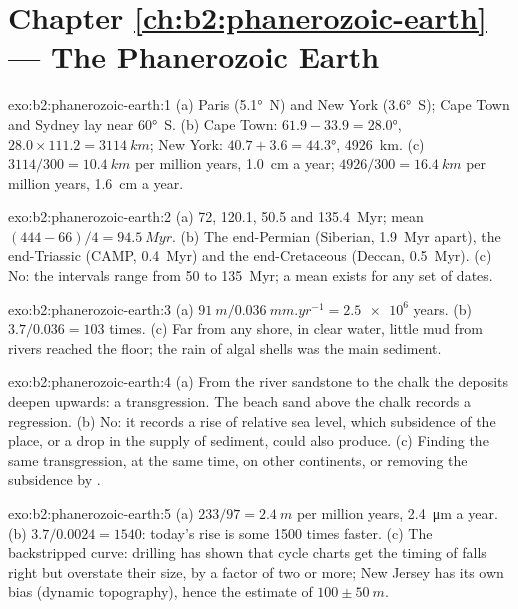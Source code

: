 \section*{Chapter \ref{ch:b2:phanerozoic-earth} --- The Phanerozoic Earth}

\begin{solution}{exo:b2:phanerozoic-earth:1}
(a) Paris (\ang{5.1}~N) and New York (\ang{3.6}~S); Cape Town and Sydney lay near \ang{60}~S.
(b) Cape Town: $61.9 - 33.9 = \ang{28.0}$, $28.0 \times 111.2 = \qty{3114}{km}$; New York:
$40.7 + 3.6 = \ang{44.3}$, \qty{4926}{km}. (c) $3114/300 = \qty{10.4}{km}$ per million years,
\qty{1.0}{cm} a year; $4926/300 = \qty{16.4}{km}$ per million years, \qty{1.6}{cm} a year.
\end{solution}

\begin{solution}{exo:b2:phanerozoic-earth:2}
(a) 72, 120.1, 50.5 and \qty{135.4}{Myr}; mean $(444 - 66)/4 = \qty{94.5}{Myr}$. (b) The
end-Permian (Siberian, \qty{1.9}{Myr} apart), the end-Triassic (CAMP, \qty{0.4}{Myr}) and the
end-Cretaceous (Deccan, \qty{0.5}{Myr}). (c) No: the intervals range from 50 to
\qty{135}{Myr}; a mean exists for any set of dates.
\end{solution}

\begin{solution}{exo:b2:phanerozoic-earth:3}
(a) $\qty{91}{m}/\qty{0.036}{mm.yr^{-1}} = \num{2.5e6}$ years. (b) $3.7/0.036 = 103$ times. (c)
Far from any shore, in clear water, little mud from rivers reached the floor; the rain of
algal shells was the main sediment.
\end{solution}

\begin{solution}{exo:b2:phanerozoic-earth:4}
(a) From the river sandstone to the chalk the deposits deepen upwards: a transgression. The
beach sand above the chalk records a regression. (b) No: it records a rise of relative sea level,
which subsidence of the place, or a drop in the supply of sediment, could also produce. (c)
Finding the same transgression, at the same time, on other continents, or removing the
subsidence by .
\end{solution}

\begin{solution}{exo:b2:phanerozoic-earth:5}
(a) $233/97 = \qty{2.4}{m}$ per million years, \qty{2.4}{\micro m} a year. (b) $3.7/0.0024 =
1540$: today's rise is some 1500 times faster. (c) The backstripped curve: drilling has shown
that cycle charts get the timing of falls right but overstate their size, by a factor of two or
more; New Jersey has its own bias (dynamic topography), hence the estimate of $100 \pm
\qty{50}{m}$.
\end{solution}

